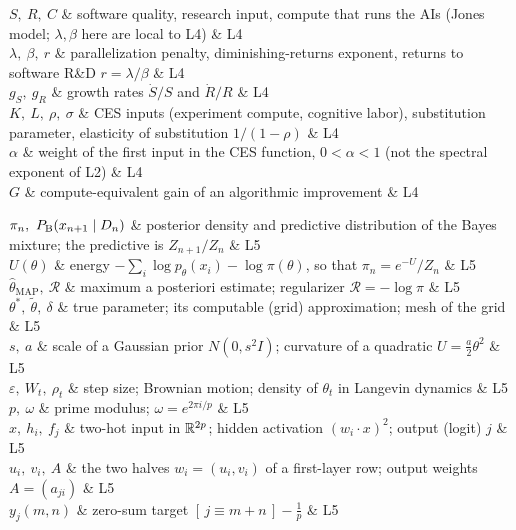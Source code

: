 \begin{notationchunk}
$S,\ R,\ C$ & software quality, research input, compute that runs the AIs (Jones model; $\lambda,\beta$ here are local to L4) & L4\\
$\lambda,\ \beta,\ r$ & parallelization penalty, diminishing-returns exponent, returns to software R\&D $r=\lambda/\beta$ & L4\\
$g_S,\ g_R$ & growth rates $\dot S/S$ and $\dot R/R$ & L4\\
$K,\ L,\ \rho,\ \sigma$ & CES inputs (experiment compute, cognitive labor), substitution parameter, elasticity of substitution $1/(1-\rho)$ & L4\\
$\alpha$ & weight of the first input in the CES function, $0<\alpha<1$ (not the spectral exponent of L2) & L4\\
$G$ & compute-equivalent gain of an algorithmic improvement & L4\\
\end{notationchunk}
\begin{notationchunk}
$\pi_n,\ P_{\mathrm{B}}(x_{n+1}\mid D_n)$ & posterior density and predictive distribution of the Bayes mixture; the predictive is $Z_{n+1}/Z_n$ & L5\\
$U(\theta)$ & energy $-\sum_i\log p_\theta(x_i)-\log\pi(\theta)$, so that $\pi_n=e^{-U}/Z_n$ & L5\\
$\hat\theta_{\mathrm{MAP}},\ \mathcal R$ & maximum a posteriori estimate; regularizer $\mathcal R=-\log\pi$ & L5\\
$\theta^*,\ \tilde\theta,\ \delta$ & true parameter; its computable (grid) approximation; mesh of the grid & L5\\
$s,\ a$ & scale of a Gaussian prior $N(0,s^2I)$; curvature of a quadratic $U=\frac a2\theta^2$ & L5\\
$\varepsilon,\ W_t,\ \rho_t$ & step size; Brownian motion; density of $\theta_t$ in Langevin dynamics & L5\\
$p,\ \omega$ & prime modulus; $\omega=e^{2\pi i/p}$ & L5\\
$x,\ h_i,\ f_j$ & two-hot input in $\mathbb{R}^{2p}$; hidden activation $(w_i\!\cdot\!x)^2$; output (logit) $j$ & L5\\
$u_i,\ v_i,\ A$ & the two halves $w_i=(u_i,v_i)$ of a first-layer row; output weights $A=(a_{ji})$ & L5\\
$y_j(m,n)$ & zero-sum target $[\,j\equiv m+n\,]-\frac1p$ & L5\\
\end{notationchunk}
